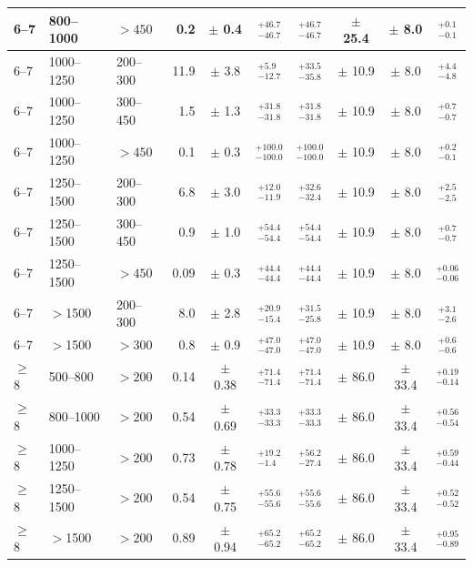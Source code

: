 \begin{table}[!hp]
{\begin{tabular}{lll|rc|cccc|c}
      6--7   & 800--1000  & $>450$   &  0.2  & $\pm$  0.4  & $^{+46.7}_{-46.7}$ & $^{+46.7}_{-46.7}$ & $\pm$  25.4 & $\pm$ 8.0 & $^{+0.1}_{-0.1}$  \\ 
      \midrule
      6--7   & 1000--1250 & 200--300  &  11.9 & $\pm$  3.8  & $^{+5.9}_{-12.7}$ & $^{+33.5}_{-35.8}$  & $\pm$  10.9 & $\pm$ 8.0 & $^{+4.4}_{-4.8}$ \\
      6--7   & 1000--1250 & 300--450  &  1.5  & $\pm$  1.3  & $^{+31.8}_{-31.8}$ & $^{+31.8}_{-31.8}$  & $\pm$  10.9 &  $\pm$ 8.0 & $^{+0.7}_{-0.7}$ \\
      6--7   & 1000--1250 & $>450$   &  0.1  & $\pm$  0.3  & $^{+100.0}_{-100.0}$ & $^{+100.0}_{-100.0}$ & $\pm$  10.9 & $\pm$ 8.0 & $^{+0.2}_{-0.1}$ \\
      \midrule
      6--7   & 1250--1500 & 200--300  &  6.8  & $\pm$  3.0  & $^{+12.0}_{-11.9}$ & $^{+32.6}_{-32.4}$ & $\pm$   10.9   & $\pm$ 8.0 & $^{+2.5}_{-2.5}$ \\
      6--7   & 1250--1500 & 300--450  &  0.9  & $\pm$  1.0  & $^{+54.4}_{-54.4}$ & $^{+54.4}_{-54.4}$ & $\pm$   10.9   & $\pm$ 8.0 & $^{+0.7}_{-0.7}$ \\
      6--7   & 1250--1500 & $>450$   &  0.09 & $\pm$  0.3  & $^{+44.4}_{-44.4}$ & $^{+44.4}_{-44.4}$ & $\pm$   10.9  & $\pm$ 8.0 & $^{+0.06}_{-0.06}$\\
      \midrule
      6--7   & $>$1500   & 200--300  &  8.0  & $\pm$  2.8  & $^{+20.9}_{-15.4}$ & $^{+31.5}_{-25.8}$ & $\pm$   10.9  & $\pm$ 8.0 & $^{+3.1}_{-2.6}$\\
      6--7   & $>$1500   & $>300$   &  0.8  & $\pm$  0.9  & $^{+47.0}_{-47.0}$ & $^{+47.0}_{-47.0}$ & $\pm$   10.9  & $\pm$ 8.0 & $^{+0.6}_{-0.6}$ \\
      \midrule 
      \midrule 
      $\geq$8 & 500--800 & $>200$   &  0.14 & $\pm$  0.38 & $^{+71.4}_{-71.4}$ & $^{+71.4}_{-71.4}$ & $\pm$ 86.0  & $\pm$ 33.4 & $^{+0.19}_{-0.14}$ \\
      $\geq$8 & 800--1000 & $>200$  &  0.54 & $\pm$  0.69 & $^{+33.3}_{-33.3}$ & $^{+33.3}_{-33.3}$ & $\pm$ 86.0  & $\pm$ 33.4 & $^{+0.56}_{-0.54}$ \\
      $\geq$8 & 1000--1250 & $>200$ &  0.73 & $\pm$  0.78 & $^{+19.2}_{-1.4}$ & $^{+56.2}_{-27.4}$  & $\pm$ 86.0 & $\pm$ 33.4 & $^{+0.59}_{-0.44}$ \\
      $\geq$8 & 1250--1500 & $>200$ &  0.54 & $\pm$  0.75 & $^{+55.6}_{-55.6}$ & $^{+55.6}_{-55.6}$ & $\pm$ 86.0 & $\pm$ 33.4 & $^{+0.52}_{-0.52}$ \\
      $\geq$8 & $>$1500   & $>200$ &  0.89 & $\pm$  0.94 & $^{+65.2}_{-65.2}$ & $^{+65.2}_{-65.2}$ & $\pm$ 86.0 & $\pm$ 33.4 & $^{+0.95}_{-0.89}$ \\
      \bottomrule
    \end{tabular}}
\end{table}

